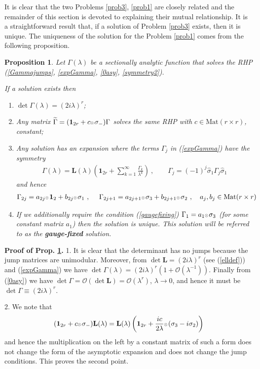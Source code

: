 \documentclass{article}
\newtheorem{prop}{Proposition}[section]
\def\L{{\mathbf L}}
\def\ot{\hbox{\resizebox{6pt}{!}{$ \otimes \,
$}}}
\def\s{\sigma}
\def\1{\mathbf 1}
\def\wh{\widehat}
\def\wt{\widetilde}
\def\Mat{\mathrm{Mat}}
\newcommand{\be}{\begin{eqnarray}}
\newcommand{\ee}{\end{eqnarray}}
\def\le{\left}
\def\ri{\right}
\begin{document}
It is clear that the two Problems  \ref{prob3}, \ref{prob1} are closely related and the remainder of this section is devoted to explaining their mutual relationship.
It is a straightforward result that, if a solution of Problem \ref{prob3} exists, then it is unique. The uniqueness of the solution for the Problem \ref{prob1} comes from the following proposition.
\begin{prop}
\label{Gammarhp}
Let $\Gamma(\lambda)$ be a sectionally analytic function that solves the  RHP (\ref{Gammajumps}, \ref{expGamma}, \ref{0asy}, \ref{symmetry2}).

If a solution exists then 
\begin{enumerate}
\item $\det \Gamma(\lambda) = (2i\lambda)^r$;
\item Any matrix $\wt \Gamma = (\1_{2r}+ c  \ot  \s_-) \Gamma$ solves the same RHP with $c\in \Mat(r\times r)$, constant;
\item Any solution has an expansion where the terms $\Gamma_j$ in (\ref{expGamma}) have the symmetry
\be
\Gamma(\lambda)  = \L(\lambda) \le(\1_{2r} + \sum_{k=1}^{\infty} \frac {\Gamma_k}{\lambda^k}\ri)\ ,\qquad
\Gamma_j = (-1)^j \wh\s_1 \Gamma_j \wh\s_1
\ee and hence 
\be
\Gamma_{2j} = a_{2j} \ot \1_{2} + b_{2j} \ot  \s_1\ ,\ \ \ \ 
\Gamma_{2j+1} = a_{2j+1}  \ot  \s_3 + b_{2j+1} \ot   \s_2\ ,\ \ \ a_j,b_j\in \Mat(r\times r)
\label{314}
\ee
\item If we additionally require the condition (\ref{gaugefixing})  $\Gamma_1 = a_1 \ot  \s_3$ (for some constant matrix  $a_1$) then the solution is unique. This solution will be referred to as the {\bf gauge-fixed} solution.
\end{enumerate}
\end{prop}
{\bf  Proof of Prop. \ref{Gammarhp}.}
1. It is clear that the determinant  has no jumps because the jump matrices are unimodular. Moreover, from $\det \L=(2i\lambda)^r$ (see (\ref{elldef}))  and (\ref{expGamma}) we have  $\det \Gamma(\lambda) = (2i\lambda)^r(1 + \mathcal O(\lambda^{-1})).$ Finally from (\ref{0asy}) we have $\det\Gamma = \mathcal O(\det \L) =\mathcal O (\lambda^r)$, $\lambda\to 0$, and hence it must be $\det\Gamma \equiv (2i\lambda)^r$.


2. We note that 
\be
(\1_{2r} + c \ot   \s_-) \L(\lambda)= \L(\lambda) \le(\1_{2r} + \frac {ic}{2\lambda} \ot   (\s_3 -i\s_2)\ri) 
\ee
and hence the multiplication on the left by a constant matrix of such a form does not change the form of the asymptotic expansion and does not change the jump conditions. This proves the second point.
\end{document}
